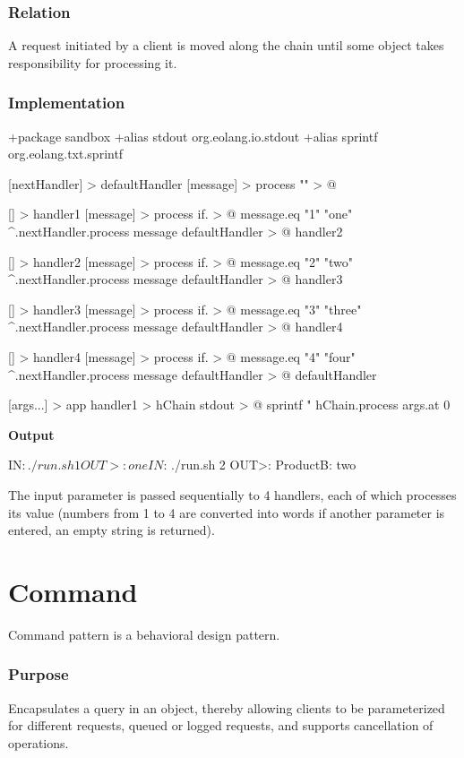 \documentclass[12pt]{book}
\begin{document}
{{\subsubsection{Relation}
A request initiated by a client is moved along the chain until some  object takes responsibility for processing it.

\subsubsection{Implementation}
\begin{ffcode}
+package sandbox
+alias stdout org.eolang.io.stdout
+alias sprintf org.eolang.txt.sprintf

[nextHandler] > defaultHandler
  [message] > process
    "" > @

[] > handler1
  [message] > process
    if. > @
      message.eq "1"
      "one"
      ^.nextHandler.process message
  defaultHandler > @
    handler2

[] > handler2
  [message] > process
    if. > @
      message.eq "2"
      "two"
      ^.nextHandler.process message
  defaultHandler > @
    handler3

[] > handler3
  [message] > process
    if. > @
      message.eq "3"
      "three"
      ^.nextHandler.process message
  defaultHandler > @
    handler4

[] > handler4
  [message] > process
    if. > @
      message.eq "4"
      "four"
      ^.nextHandler.process message
  defaultHandler > @
    defaultHandler

[args...] > app
  handler1 > hChain
  stdout > @
    sprintf
      "%
      hChain.process
        args.at 0
\end{ffcode}
\textbf{Output}
\begin{ffcode}
IN$: ./run.sh 1
OUT>: one
IN$: ./run.sh 2
OUT>: ProductB: two
\end{ffcode}

The input parameter  is passed sequentially to 4 handlers, each of which processes its value (numbers from 1 to 4 are converted into words if another parameter is entered, an empty string is returned).

\section{Command}
Command pattern is a behavioral design pattern.

\subsubsection{Purpose}
Encapsulates a query in an object, thereby allowing clients to be parameterized  for different requests, queued or logged requests, and supports cancellation of operations.

}}
\end{document}
